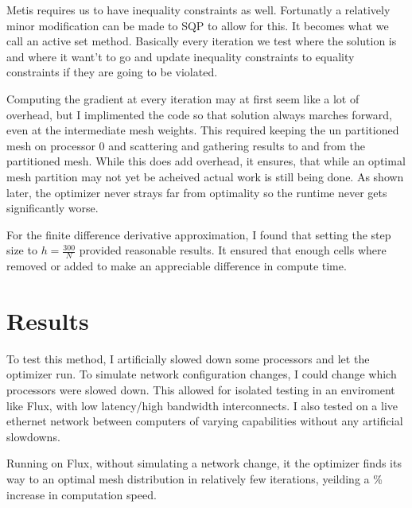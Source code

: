 \documentclass[12pt,parskip=full]{article}
\numberwithin{subsection}{section}
\begin{document}
		Metis requires us to have inequality constraints as well. Fortunatly a relatively minor modification can be made to SQP to allow for this.
		It becomes what we call an active set method. Basically every iteration we test where the solution is and where it want't to go and
		update inequality constraints to equality constraints if they are going to be violated.

		Computing the gradient at every iteration may at first seem like a lot of overhead, but I implimented the code so that solution always marches
		forward, even at the intermediate mesh weights. This required keeping the un partitioned mesh on processor 0 and scattering and gathering
		results to and from the partitioned mesh. While this does add overhead, it ensures, that while an optimal mesh partition may not yet be acheived
		actual work is still being done. As shown later, the optimizer never strays far from optimality so the runtime never gets significantly worse.
		
		For the finite difference derivative approximation, I found that setting the step size to $h = \frac{300}{N}$ provided reasonable results.
		It ensured that enough cells where removed or added to make an appreciable difference in compute time.

	\section{Results}
		To test this method, I artificially slowed down some processors and let the optimizer run. To simulate network configuration changes, I could
		change which processors were slowed down. This allowed for isolated testing in an enviroment like Flux, with low latency/high bandwidth interconnects.
		I also tested on a live ethernet network between computers of varying capabilities without any artificial slowdowns.

		Running on Flux, without simulating a network change, it the optimizer finds its way to an optimal mesh distribution in relatively few iterations,
		yeilding a \% increase in computation speed.
\end{document}
